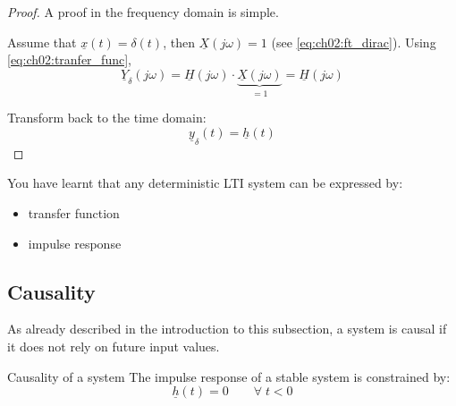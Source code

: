 \begin{refsection}
\begin{proof}{}
	A proof in the frequency domain is simple.
	
	Assume that $\underline{x}(t) = \delta(t)$, then $\underline{X}\left(j \omega\right) = 1$ (see \eqref{eq:ch02:ft_dirac}). Using \eqref{eq:ch02:tranfer_func},
	\begin{equation}
		\underline{Y}_\delta\left(j \omega\right) = \underline{H}\left(j \omega\right) \cdot \underbrace{\underline{X}\left(j \omega\right)}_{= 1} = \underline{H}\left(j \omega\right)
	\end{equation}
	
	Transform back to the time domain:
	\begin{equation}
		\underline{y}_\delta(t) = \underline{h}(t)
	\end{equation}
\end{proof}

You have learnt that any deterministic \ac{LTI} system can be expressed by:
\begin{itemize}
	\item transfer function
	\item impulse response
\end{itemize}

\subsection{Causality}

As already described in the introduction to this subsection, a system is causal if it does not rely on future input values.

\begin{definition}{Causality of a system}
	The impulse response of a stable system is constrained by:
	\begin{equation}
		\underline{h}(t) = 0 \qquad \forall \; t < 0
	\end{equation}
\end{definition}


\end{refsection}
